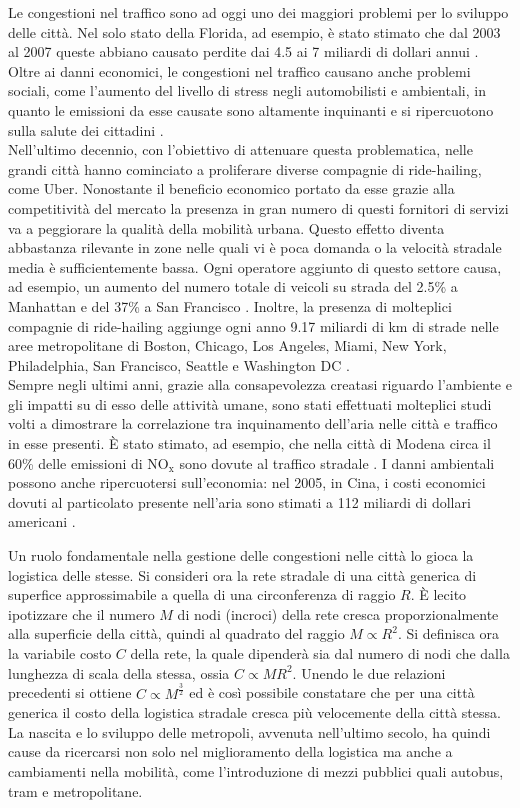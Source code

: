 \documentclass[../main.tex]{subfiles}
\begin{document}
Le congestioni nel traffico sono ad oggi uno dei maggiori problemi per lo sviluppo delle citt\`a.
Nel solo stato della Florida, ad esempio, \`e stato stimato che dal 2003 al 2007 queste abbiano causato perdite dai 4.5 ai 7 miliardi di dollari annui \cite{florida}.
Oltre ai danni economici, le congestioni nel traffico causano anche problemi sociali, come l'aumento del livello di stress negli automobilisti \cite{hennessy1999traffic} e ambientali, in quanto le emissioni da esse causate sono altamente inquinanti e si ripercuotono sulla salute dei cittadini \cite{zhang2013air}.\\
Nell'ultimo decennio, con l'obiettivo di attenuare questa problematica, nelle grandi citt\`a hanno cominciato a proliferare diverse compagnie di ride-hailing, come Uber.
Nonostante il beneficio economico portato da esse grazie alla competitivit\`a del mercato la presenza in gran numero di questi fornitori di servizi va a peggiorare la qualit\`a della mobilit\`a urbana.
Questo effetto diventa abbastanza rilevante in zone nelle quali vi \`e poca domanda o la velocit\`a stradale media \`e sufficientemente bassa.
Ogni operatore aggiunto di questo settore causa, ad esempio, un aumento del numero totale di veicoli su strada del 2.5\% a Manhattan e del 37\% a San Francisco \cite{Kondor2022}.
Inoltre, la presenza di molteplici compagnie di ride-hailing aggiunge ogni anno 9.17 miliardi di km di strade nelle aree metropolitane di Boston, Chicago, Los Angeles, Miami, New York, Philadelphia, San Francisco, Seattle e Washington DC \cite{schaller2018new}.\\
Sempre negli ultimi anni, grazie alla consapevolezza creatasi riguardo l'ambiente e gli impatti su di esso delle attivit\`a umane, sono stati effettuati molteplici studi volti a dimostrare la correlazione tra inquinamento dell'aria nelle citt\`a e traffico in esse presenti.
\`E stato stimato, ad esempio, che nella citt\`a di Modena circa il 60\% delle emissioni di NO$_\text{x}$ sono dovute al traffico stradale \cite{veratti2017mu}.
I danni ambientali possono anche ripercuotersi sull'economia: nel 2005, in Cina, i costi economici dovuti al particolato presente nell'aria sono stimati a 112 miliardi di dollari americani \cite{MATUS201255}.

Un ruolo fondamentale nella gestione delle congestioni nelle citt\`a lo gioca la logistica delle stesse.
Si consideri ora la rete stradale di una citt\`a generica di superfice approssimabile a quella di una circonferenza di raggio $R$.
\`E lecito ipotizzare che il numero $M$ di nodi (incroci) della rete cresca proporzionalmente alla superficie della citt\`a, quindi al quadrato del raggio $M\propto R^2$.
Si definisca ora la variabile costo $C$ della rete, la quale dipender\`a sia dal numero di nodi che dalla lunghezza di scala della stessa, ossia $C\propto MR^2$.
Unendo le due relazioni precedenti si ottiene $C\propto M^\frac{3}{2}$ ed \`e cos\`i possibile constatare che per una citt\`a generica il costo della logistica stradale cresca pi\`u velocemente della citt\`a stessa.
La nascita e lo sviluppo delle metropoli, avvenuta nell'ultimo secolo, ha quindi cause da ricercarsi non solo nel miglioramento della logistica ma anche a cambiamenti nella mobilit\`a, come l'introduzione di mezzi pubblici quali autobus, tram e metropolitane.
\end{document}
